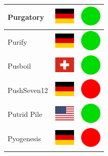 \documentclass[12pt, a4paper, twoside]{report}
\begin{document}
\begin{center}
\begin{longtable}{|p{5cm}|p{2cm}|p{2cm}|}
Purgatory & \includegraphics[width=1cm]{4x3/de} & \includegraphics[width=1cm]{likes/y} \\ \hline
Purify & \includegraphics[width=1cm]{4x3/de} & \includegraphics[width=1cm]{likes/y} \\ \hline
Pusboil & \includegraphics[width=1cm]{4x3/ch} & \includegraphics[width=1cm]{likes/y} \\ \hline
PushSeven12 & \includegraphics[width=1cm]{4x3/de} & \includegraphics[width=1cm]{likes/n} \\ \hline
Putrid Pile & \includegraphics[width=1cm]{4x3/us} & \includegraphics[width=1cm]{likes/y} \\ \hline
Pyogenesis & \includegraphics[width=1cm]{4x3/de} & \includegraphics[width=1cm]{likes/n} \\ \hline

\end{longtable}
\end{center}
\end{document}
